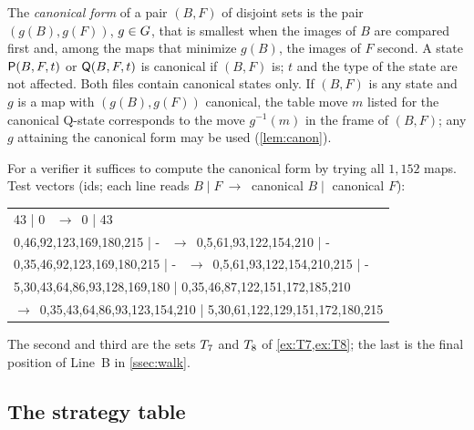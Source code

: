 The \emph{canonical form} of a pair $(B,F)$ of disjoint sets is the pair $(g(B),g(F))$, $g\in G$, that is
smallest when the images of $B$ are compared first and, among the maps that minimize $g(B)$, the images
of $F$ second. A state $\mathsf{P}(B,F,t)$ or $\mathsf{Q}(B,F,t)$ is canonical if $(B,F)$ is; $t$ and the type of the
state are not affected. Both files contain canonical states only. If $(B,F)$ is any state and $g$ is a map
with $(g(B),g(F))$ canonical, the table move $m$ listed for the canonical Q-state corresponds to the move
$g^{-1}(m)$ in the frame of $(B,F)$; any $g$ attaining the canonical form may be used (\cref{lem:canon}).

For a verifier it suffices to compute the canonical form by trying all $1{,}152$ maps. Test vectors (ids;
each line reads $B\mid F\ \to\ $ canonical $B\mid$ canonical $F$):
\begin{center}\small\ttfamily
\begin{tabular}{@{}l@{}}
43 | 0 \ $\to$\ 0 | 43\\
0,46,92,123,169,180,215 | - \ $\to$\ 0,5,61,93,122,154,210 | -\\
0,35,46,92,123,169,180,215 | - \ $\to$\ 0,5,61,93,122,154,210,215 | -\\
5,30,43,64,86,93,128,169,180 | 0,35,46,87,122,151,172,185,210\\
\qquad$\to$\ 0,35,43,64,86,93,123,154,210 | 5,30,61,122,129,151,172,180,215
\end{tabular}
\end{center}
The second and third are the sets $T_7$ and $T_8$ of \cref{ex:T7,ex:T8}; the last is the final
position of Line~B in \cref{ssec:walk}.

\subsection{The strategy table}\label{ssec:fmt-table}

